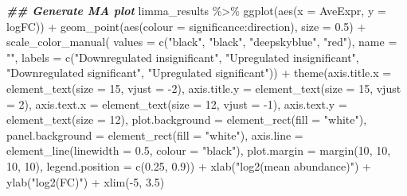 \documentclass[9pt,a4paper,]{extarticle}
\newenvironment{Shaded}{\begin{snugshade}}{\end{snugshade}}
\newcommand{\AttributeTok}[1]{\textcolor[rgb]{0.77,0.63,0.00}{#1}}
\newcommand{\DecValTok}[1]{\textcolor[rgb]{0.00,0.00,0.81}{#1}}
\newcommand{\DocumentationTok}[1]{\textcolor[rgb]{0.56,0.35,0.01}{\textbf{\textit{#1}}}}
\newcommand{\FloatTok}[1]{\textcolor[rgb]{0.00,0.00,0.81}{#1}}
\newcommand{\FunctionTok}[1]{\textcolor[rgb]{0.00,0.00,0.00}{#1}}
\newcommand{\NormalTok}[1]{#1}
\newcommand{\SpecialCharTok}[1]{\textcolor[rgb]{0.00,0.00,0.00}{#1}}
\newcommand{\StringTok}[1]{\textcolor[rgb]{0.31,0.60,0.02}{#1}}
\begin{document}
\begin{Shaded}
\begin{Highlighting}[]
\DocumentationTok{\#\# Generate MA plot}
\NormalTok{limma\_results }\SpecialCharTok{\%\textgreater{}\%}
  \FunctionTok{ggplot}\NormalTok{(}\FunctionTok{aes}\NormalTok{(}\AttributeTok{x =}\NormalTok{ AveExpr, }\AttributeTok{y =}\NormalTok{ logFC)) }\SpecialCharTok{+}
  \FunctionTok{geom\_point}\NormalTok{(}\FunctionTok{aes}\NormalTok{(}\AttributeTok{colour =}\NormalTok{ significance}\SpecialCharTok{:}\NormalTok{direction), }\AttributeTok{size =} \FloatTok{0.5}\NormalTok{) }\SpecialCharTok{+}
  \FunctionTok{scale\_color\_manual}\NormalTok{(}
    \AttributeTok{values =} \FunctionTok{c}\NormalTok{(}\StringTok{"black"}\NormalTok{, }\StringTok{"black"}\NormalTok{, }\StringTok{"deepskyblue"}\NormalTok{, }\StringTok{"red"}\NormalTok{), }\AttributeTok{name =} \StringTok{""}\NormalTok{,}
    \AttributeTok{labels =} \FunctionTok{c}\NormalTok{(}\StringTok{"Downregulated insignificant"}\NormalTok{,}
               \StringTok{"Upregulated insignificant"}\NormalTok{,}
               \StringTok{"Downregulated significant"}\NormalTok{,}
               \StringTok{"Upregulated significant"}\NormalTok{)) }\SpecialCharTok{+}
  \FunctionTok{theme}\NormalTok{(}\AttributeTok{axis.title.x =} \FunctionTok{element\_text}\NormalTok{(}\AttributeTok{size =} \DecValTok{15}\NormalTok{, }\AttributeTok{vjust =} \SpecialCharTok{{-}}\DecValTok{2}\NormalTok{),}
        \AttributeTok{axis.title.y =} \FunctionTok{element\_text}\NormalTok{(}\AttributeTok{size =} \DecValTok{15}\NormalTok{, }\AttributeTok{vjust =} \DecValTok{2}\NormalTok{),}
        \AttributeTok{axis.text.x =} \FunctionTok{element\_text}\NormalTok{(}\AttributeTok{size =} \DecValTok{12}\NormalTok{, }\AttributeTok{vjust =} \SpecialCharTok{{-}}\DecValTok{1}\NormalTok{),}
        \AttributeTok{axis.text.y =} \FunctionTok{element\_text}\NormalTok{(}\AttributeTok{size =} \DecValTok{12}\NormalTok{),}
        \AttributeTok{plot.background =} \FunctionTok{element\_rect}\NormalTok{(}\AttributeTok{fill =} \StringTok{"white"}\NormalTok{),}
        \AttributeTok{panel.background =} \FunctionTok{element\_rect}\NormalTok{(}\AttributeTok{fill =} \StringTok{"white"}\NormalTok{),}
        \AttributeTok{axis.line =} \FunctionTok{element\_line}\NormalTok{(}\AttributeTok{linewidth =} \FloatTok{0.5}\NormalTok{, }\AttributeTok{colour =} \StringTok{"black"}\NormalTok{),}
        \AttributeTok{plot.margin =} \FunctionTok{margin}\NormalTok{(}\DecValTok{10}\NormalTok{, }\DecValTok{10}\NormalTok{, }\DecValTok{10}\NormalTok{, }\DecValTok{10}\NormalTok{),}
        \AttributeTok{legend.position =} \FunctionTok{c}\NormalTok{(}\FloatTok{0.25}\NormalTok{, }\FloatTok{0.9}\NormalTok{)) }\SpecialCharTok{+}
  \FunctionTok{xlab}\NormalTok{(}\StringTok{"log2(mean abundance)"}\NormalTok{) }\SpecialCharTok{+}
  \FunctionTok{ylab}\NormalTok{(}\StringTok{"log2(FC)"}\NormalTok{) }\SpecialCharTok{+}
  \FunctionTok{xlim}\NormalTok{(}\SpecialCharTok{{-}}\DecValTok{5}\NormalTok{, }\FloatTok{3.5}\NormalTok{)}
\end{Highlighting}
\end{Shaded}
\end{document}

